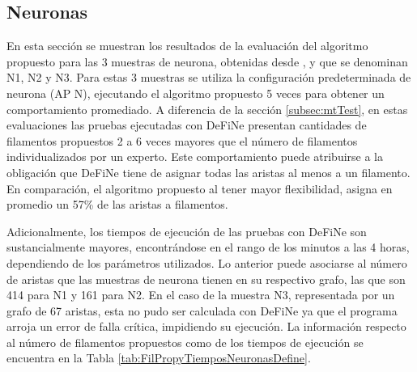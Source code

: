 \clearpage
\newpage

\subsection{Neuronas}
\label{subsec:neuronTest}
En esta secci\'on se muestran los resultados de la evaluaci\'on del algoritmo propuesto para las 3 muestras de neurona, obtenidas desde \citet{ampuero2019chronic}, y que se denominan N1, N2 y N3. Para estas 3 muestras se utiliza la configuraci\'on predeterminada de neurona (AP N), ejecutando el algoritmo propuesto 5 veces para obtener un comportamiento promediado. A diferencia de la secci\'on \ref{subsec:mtTest}, en estas evaluaciones las pruebas ejecutadas con DeFiNe presentan cantidades de filamentos propuestos 2 a 6 veces mayores que el n\'umero de filamentos individualizados por un experto. Este comportamiento puede atribuirse a la obligaci\'on que DeFiNe tiene de asignar todas las aristas al menos a un filamento. En comparaci\'on, el algoritmo propuesto al tener mayor flexibilidad, asigna en promedio un 57\% de las aristas a filamentos.

Adicionalmente, los tiempos de ejecuci\'on de las pruebas con DeFiNe son sustancialmente mayores, encontr\'andose en el rango de los minutos a las 4 horas, dependiendo de los par\'ametros utilizados. Lo anterior puede asociarse al n\'umero de aristas que las muestras de neurona tienen en su respectivo grafo, las que son 414 para N1 y 161 para N2. En el caso de la muestra N3, representada por un grafo de 67 aristas, esta no pudo ser calculada con DeFiNe ya que el programa arroja un error de falla cr\'itica, impidiendo su ejecuci\'on. La informaci\'on respecto al n\'umero de filamentos propuestos como de los tiempos de ejecuci\'on se encuentra en la Tabla \ref{tab:FilPropyTiemposNeuronasDefine}.

